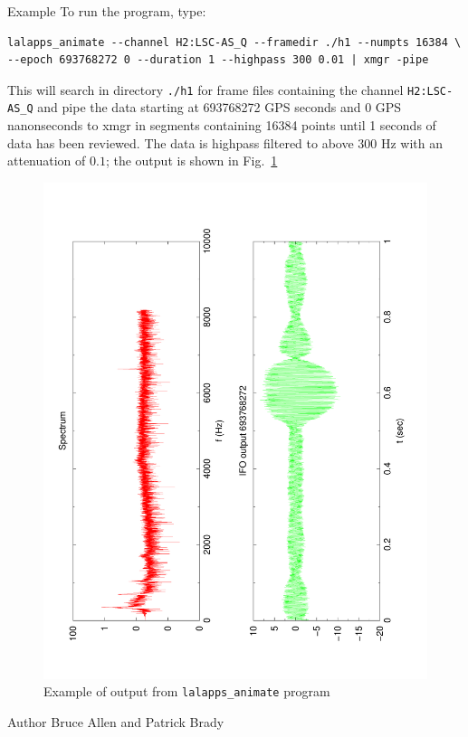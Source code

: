 \begin{entry}
\item[Example]
To run the program,  type:
\begin{verbatim}
lalapps_animate --channel H2:LSC-AS_Q --framedir ./h1 --numpts 16384 \
--epoch 693768272 0 --duration 1 --highpass 300 0.01 | xmgr -pipe
\end{verbatim}
This will search in directory \verb$./h1$ for frame files containing
the channel \verb$H2:LSC-AS_Q$ and pipe the data starting at 693768272
GPS seconds and 0 GPS nanonseconds to xmgr in segments containing 16384 
points until 1 seconds of data has been reviewed.  The data is highpass 
filtered to above 300 Hz with an attenuation of $0.1$;  the output is
shown in Fig.~\ref{f:animate}
\begin{figure}[h]
\label{f:animate}
\caption{Example of output from \texttt{lalapps\_animate} program}
\begin{center}
\includegraphics[angle=-90,width=400pt]{animate}
\end{center}
\end{figure}

\item[Author]
Bruce Allen and Patrick Brady

\end{entry}
